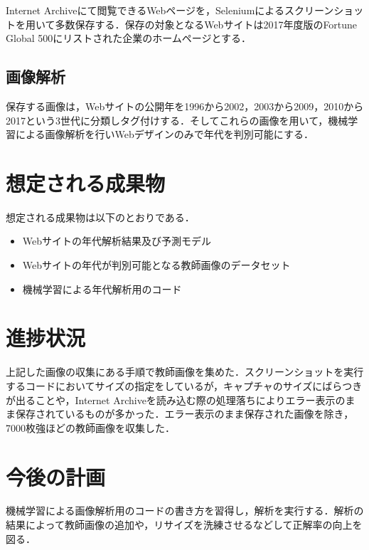 \documentclass[uplatex,twocolumn,dvipdfmx]{jsarticle}
\begin{document}
Internet Archiveにて閲覧できるWebページを，Seleniumによるスクリーンショットを用いて多数保存する．保存の対象となるWebサイトは2017年度版のFortune Global 500\cite{bib003}にリストされた企業のホームページとする．

\subsection{画像解析}

保存する画像は，Webサイトの公開年を1996から2002，2003から2009，2010から2017という3世代に分類しタグ付けする．そしてこれらの画像を用いて，機械学習による画像解析を行いWebデザインのみで年代を判別可能にする．


\section{想定される成果物}

想定される成果物は以下のとおりである．

\begin{itemize}
\item Webサイトの年代解析結果及び予測モデル
\item Webサイトの年代が判別可能となる教師画像のデータセット
\item 機械学習による年代解析用のコード
\end{itemize}

\section{進捗状況}

上記した画像の収集にある手順で教師画像を集めた．スクリーンショットを実行するコードにおいてサイズの指定をしているが，キャプチャのサイズにばらつきが出ることや，Internet Archiveを読み込む際の処理落ちによりエラー表示のまま保存されているものが多かった．エラー表示のまま保存された画像を除き，7000枚強ほどの教師画像を収集した．

\section{今後の計画}

機械学習による画像解析用のコードの書き方を習得し，解析を実行する．解析の結果によって教師画像の追加や，リサイズを洗練させるなどして正解率の向上を図る．


\end{document}
